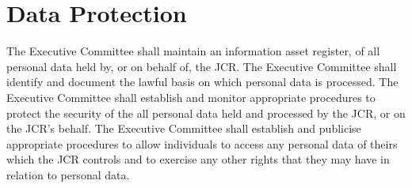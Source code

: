 \section{Data Protection}
\npara The Executive Committee shall maintain an information asset register, of all personal data held by, or on behalf of, the JCR.  The Executive Committee shall identify and document the lawful basis on which personal data is processed.
\npara The Executive Committee shall establish and monitor appropriate procedures to protect the security of the all personal data held and processed by the JCR, or on the JCR's behalf.
\npara The Executive Committee shall establish and publicise appropriate procedures to allow individuals to access any personal data of theirs which the JCR controls and to exercise any other rights that they may have in relation to personal data.